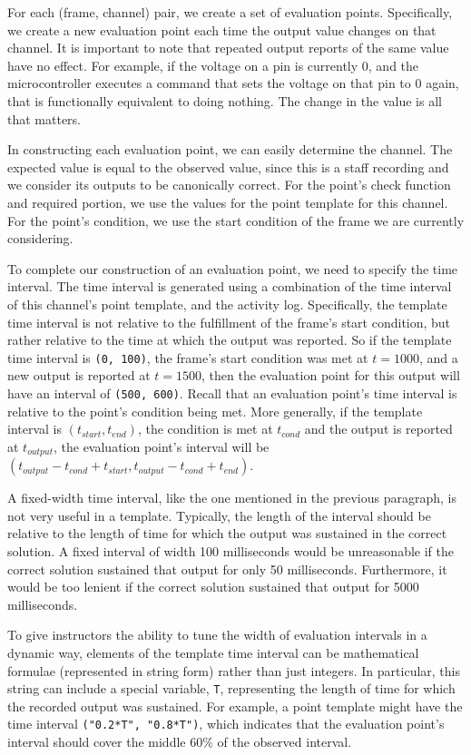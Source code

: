 \documentclass[12pt]{article}
\begin{document}
For each (frame, channel) pair, we create a set of evaluation points.  Specifically, we create a new evaluation point each time the output value changes on that channel.  It is important to note that repeated output reports of the same value have no effect.  For example, if the voltage on a pin is currently 0, and the microcontroller executes a command that sets the voltage on that pin to 0 again, that is functionally equivalent to doing nothing.  The change in the value is all that matters.

In constructing each evaluation point, we can easily determine the channel.  The expected value is equal to the observed value, since this is a staff recording and we consider its outputs to be canonically correct.   For the point's check function and required portion, we use the values for the point template for this channel.  For the point's condition, we use the start condition of the frame we are currently considering.

To complete our construction of an evaluation point, we need to specify the time interval.  The time interval is generated using a combination of the time interval of this channel's point template, and the activity log.  Specifically, the template time interval is not relative to the fulfillment of the frame's start condition, but rather relative to the time at which the output was reported.  So if the template time interval is \texttt{(0, 100)}, the frame's start condition was met at $t=1000$, and a new output is reported at $t=1500$, then the evaluation point for this output will have an interval of \texttt{(500, 600)}.  Recall that an evaluation point's time interval is relative to the point's condition being met.  More generally, if the template interval is $(t_{start}, t_{end})$, the condition is met at $t_{cond}$ and the output is reported at $t_{output}$, the evaluation point's interval will be $(t_{output} - t_{cond} + t_{start}, t_{output} - t_{cond} + t_{end})$.

A fixed-width time interval, like the one mentioned in the previous paragraph, is not very useful in a template.  Typically, the length of the interval should be relative to the length of time for which the output was sustained in the correct solution.  A fixed interval of width 100 milliseconds would be unreasonable if the correct solution sustained that output for only 50 milliseconds.  Furthermore, it would be too lenient if the correct solution sustained that output for 5000 milliseconds.

To give instructors the ability to tune the width of evaluation intervals in a dynamic way, elements of the template time interval can be mathematical formulae (represented in string form) rather than just integers.  In particular, this string can include a special variable, \texttt{T}, representing the length of time for which the recorded output was sustained.  For example, a point template might have the time interval \texttt{("0.2*T", "0.8*T")}, which indicates that the evaluation point's interval should cover the middle 60\% of the observed interval. 
\end{document}
